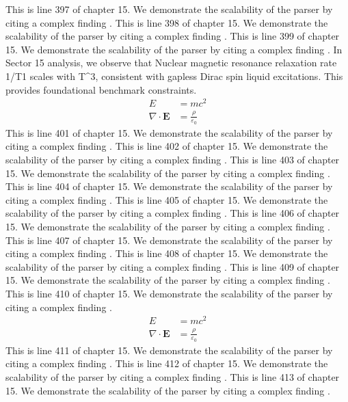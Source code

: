 This is line 397 of chapter 15. We demonstrate the scalability of the parser by citing a complex finding \cite{ref15_397}.
This is line 398 of chapter 15. We demonstrate the scalability of the parser by citing a complex finding \cite{ref15_398}.
This is line 399 of chapter 15. We demonstrate the scalability of the parser by citing a complex finding \cite{ref15_399}.
In Sector 15 analysis, we observe that Nuclear magnetic resonance relaxation rate 1/T1 scales with T^3, consistent with gapless Dirac spin liquid excitations. This provides foundational benchmark constraints.
\begin{align*}
  E &= mc^2 \\
  \nabla \cdot \mathbf{E} &= \frac{\rho}{\varepsilon_0}
\end{align*}
This is line 401 of chapter 15. We demonstrate the scalability of the parser by citing a complex finding \cite{ref15_401}.
This is line 402 of chapter 15. We demonstrate the scalability of the parser by citing a complex finding \cite{ref15_402}.
This is line 403 of chapter 15. We demonstrate the scalability of the parser by citing a complex finding \cite{ref15_403}.
This is line 404 of chapter 15. We demonstrate the scalability of the parser by citing a complex finding \cite{ref15_404}.
This is line 405 of chapter 15. We demonstrate the scalability of the parser by citing a complex finding \cite{ref15_405}.
This is line 406 of chapter 15. We demonstrate the scalability of the parser by citing a complex finding \cite{ref15_406}.
This is line 407 of chapter 15. We demonstrate the scalability of the parser by citing a complex finding \cite{ref15_407}.
This is line 408 of chapter 15. We demonstrate the scalability of the parser by citing a complex finding \cite{ref15_408}.
This is line 409 of chapter 15. We demonstrate the scalability of the parser by citing a complex finding \cite{ref15_409}.
This is line 410 of chapter 15. We demonstrate the scalability of the parser by citing a complex finding \cite{ref15_410}.
\begin{align*}
  E &= mc^2 \\
  \nabla \cdot \mathbf{E} &= \frac{\rho}{\varepsilon_0}
\end{align*}
This is line 411 of chapter 15. We demonstrate the scalability of the parser by citing a complex finding \cite{ref15_411}.
This is line 412 of chapter 15. We demonstrate the scalability of the parser by citing a complex finding \cite{ref15_412}.
This is line 413 of chapter 15. We demonstrate the scalability of the parser by citing a complex finding \cite{ref15_413}.
